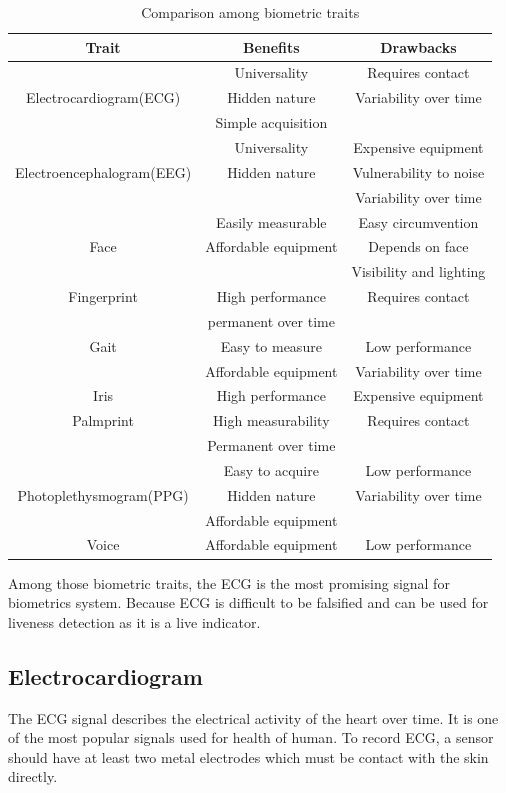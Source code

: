 \documentclass[a4paper,12pt]{article}
\begin{document}
\begin{table}

\centering
 \begin{tabular}{c c c} 
 Trait & Benefits & Drawbacks \\ [0.5ex] 
 \hline\hline
  & Universality & Requires contact \\ Electrocardiogram(ECG) & Hidden nature & Variability over time \\ & Simple acquisition & \\ 
 \hline
  & Universality & Expensive equipment \\ Electroencephalogram(EEG) & Hidden nature & Vulnerability to noise \\ &  & Variability over time \\ 
 \hline
  & Easily measurable & Easy circumvention \\ Face & Affordable equipment & Depends on face \\ & & Visibility and lighting \\ 
 \hline
  Fingerprint & High performance & Requires contact \\ & permanent over time & \\
 \hline
  Gait & Easy to measure & Low performance \\ & Affordable equipment & Variability over time \\
  \hline
  Iris & High performance & Expensive equipment \\
  \hline
  Palmprint & High measurability & Requires contact \\ & Permanent over time &  \\ 
  \hline
  & Easy to acquire & Low performance \\ Photoplethysmogram(PPG) & Hidden nature & Variability over time \\ & Affordable equipment & \\ 
  \hline
 Voice & Affordable equipment & Low performance \\ [1ex] 
 \hline
\end{tabular}
\caption{Comparison among biometric traits\autocite{Pinto:2018evolution}}
\label{tab:comparision}
\end{table}

Among those biometric traits, the ECG is the most promising signal for biometrics system\parencite{Pinto:2018evolution}. Because ECG is difficult to be falsified and can be used for liveness detection as it is a live indicator\parencite{Wang:2007analysis}.

\subsection{Electrocardiogram}
The ECG signal describes the electrical activity of the heart over time. It is one of the most popular signals used for health of human. To record ECG, a sensor should have at least two metal electrodes which must be contact with the skin directly\parencite{Blasco:2018feasibility}.
\end{document}
